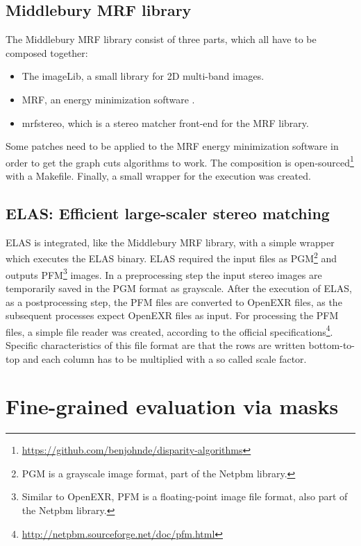 \subsection*{Middlebury MRF library}

The Middlebury MRF library \citep{scharstein2006middlebury} consist of three parts, which all have to be composed together:
\begin{itemize}
  \item The imageLib, a small library for 2D multi-band images.
  \item MRF, an energy minimization software \citep{szeliski2008comparative}.
  \item mrfstereo, which is a stereo matcher front-end for the MRF library.
\end{itemize}

\noindent Some patches need to be applied to the MRF energy minimization software in order to get the graph cuts algorithms to work.
The composition is open-sourced\footnote{\url{https://github.com/benjohnde/disparity-algorithms}} with a Makefile.
Finally, a small wrapper for the execution was created.

\subsection*{ELAS: Efficient large-scaler stereo matching}

ELAS is integrated, like the Middlebury MRF library, with a simple wrapper which executes the ELAS binary.
ELAS required the input files as PGM\footnote{PGM is a grayscale image format, part of the Netpbm library.} and outputs PFM\footnote{Similar to OpenEXR, PFM is a floating-point image file format, also part of the Netpbm library.} images.
In a preprocessing step the input stereo images are temporarily saved in the PGM format as grayscale.
After the execution of ELAS, as a postprocessing step, the PFM files are converted to OpenEXR files, as the subsequent processes expect OpenEXR files as input.
For processing the PFM files, a simple file reader was created, according to the official specifications\footnote{\url{http://netpbm.sourceforge.net/doc/pfm.html}}.
Specific characteristics of this file format are that the rows are written bottom-to-top and each column has to be multiplied with a so called scale factor.

\section{Fine-grained evaluation via masks}

